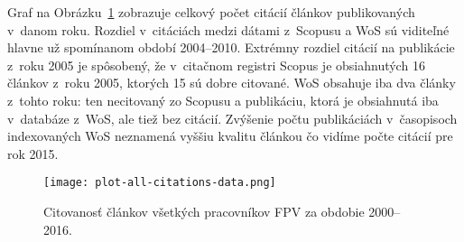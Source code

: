Graf na Obrázku~\ref{fig:all.citations.plot} zobrazuje celkový počet citácií
článkov publikovaných v~danom roku.  Rozdiel v~citáciách medzi dátami z~Scopusu
a WoS sú viditeľné hlavne už spomínanom období 2004--2010.  Extrémny rozdiel
citácií na publikácie z~roku 2005 je spôsobený, že v~citačnom registri Scopus je
obsiahnutých 16 článkov z~roku 2005, ktorých 15 sú dobre citované.  WoS obsahuje
iba dva články z~tohto roku: ten necitovaný zo Scopusu a publikáciu, ktorá je
obsiahnutá iba v~databáze z~WoS, ale tiež bez citácií.  Zvýšenie počtu
publikáciách v~časopisoch indexovaných WoS neznamená vyššiu kvalitu článkou čo
vidíme počte citácií pre rok 2015.

\begin{figure}
  \centering
  \texttt{[image: plot-all-citations-data.png]}
  \caption{Citovanosť článkov všetkých pracovníkov FPV za obdobie
    2000--2016.}
  \label{fig:all.citations.plot}
\end{figure}

